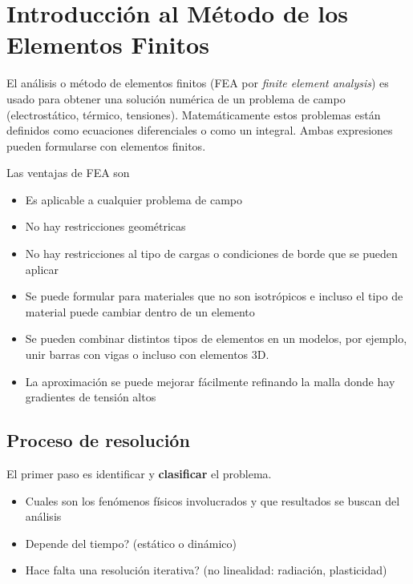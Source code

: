 

\section{Introducción al Método de los Elementos Finitos}
El análisis o método de elementos finitos (FEA por \textit{finite element analysis}) es usado para obtener una solución numérica de un problema de campo (electrostático, térmico, tensiones). Matemáticamente estos problemas están definidos como ecuaciones diferenciales o como un integral. Ambas expresiones pueden formularse con elementos finitos.

Las ventajas de FEA son
\vspace{-.3cm}
\begin{itemize}
	\item Es aplicable a cualquier problema de campo
	\item No hay restricciones geométricas
	\item No hay restricciones al tipo de cargas o condiciones de borde que se pueden aplicar
	\item Se puede formular para materiales que no son isotrópicos e incluso el tipo de material puede cambiar dentro de un elemento
	\item Se pueden combinar distintos tipos de elementos en un modelos, por ejemplo, unir barras con vigas o incluso con elementos 3D.
	\item La aproximación se puede mejorar fácilmente refinando la malla donde hay gradientes de tensión altos
\end{itemize}
\vspace{-.7cm}
\subsection*{Proceso de resolución}
El primer paso es identificar y \textbf{clasificar} el problema.
\begin{itemize}
	\item Cuales son los fenómenos físicos involucrados y que resultados se buscan del análisis
	\item Depende del tiempo? (estático o dinámico)
	\item Hace falta una resolución iterativa? (no linealidad: radiación, plasticidad)
\end{itemize} 

